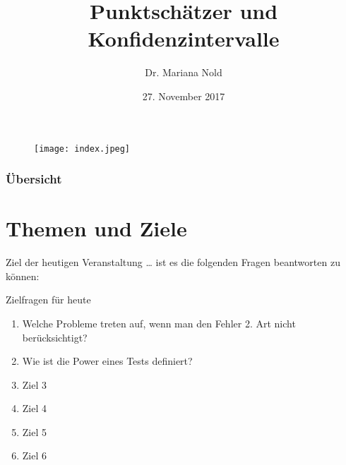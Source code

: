 \documentclass[usenames,dvipsnames,handout]{beamer}
\begin{document}
\author[Dr. Mariana Nold]{Dr. Mariana Nold}
 \date{}
\title [Punktschätzer und Konfidenzintervalle ]{Punktschätzer und Konfidenzintervalle }
\date{27. November 2017}
\begin{frame}
\maketitle

  \begin{figure}[ht]
 	\centering
 	      \texttt{[image: index.jpeg]}
 	\end{figure}
\end{frame} 

\begin{frame}
  \frametitle{Übersicht}
  \tableofcontents
\end{frame}

\section{Themen und Ziele}





\begin{frame}{Ziel der heutigen Veranstaltung \dots}
ist es die folgenden Fragen beantworten zu können:
\begin{block}{Zielfragen für heute}
\begin{enumerate}
\item{Welche Probleme treten auf, wenn man den Fehler 2. Art nicht berücksichtigt?}
\item{Wie ist die Power eines Tests definiert?}
\item{Ziel 3}
\item{Ziel 4}
\item{Ziel 5}
\item{Ziel 6}
\end{enumerate}
\end{block}
\end{frame}
\end{document}
